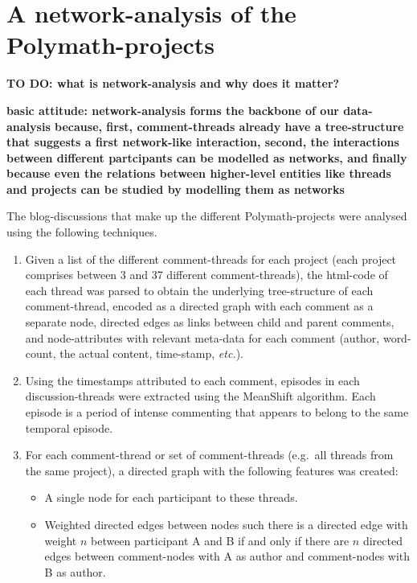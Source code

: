 \documentclass[article, floatfix, groupaddress, prb]{revtex4-1}
\providecommand{\tightlist}{%
      \setlength{\itemsep}{0pt}\setlength{\parskip}{0pt}}
\begin{document}
    \section{A network-analysis of the
Polymath-projects}\label{a-network-analysis-of-the-polymath-projects}

\textbf{TO DO: what is network-analysis and why does it matter?}

\textbf{basic attitude: network-analysis forms the backbone of our
data-analysis because, first, comment-threads already have a
tree-structure that suggests a first network-like interaction, second,
the interactions between different partcipants can be modelled as
networks, and finally because even the relations between higher-level
entities like threads and projects can be studied by modelling them as
networks}

The blog-discussions that make up the different Polymath-projects were
analysed using the following techniques.

\begin{enumerate}
\def\labelenumi{\arabic{enumi}.}
\item
  Given a list of the different comment-threads for each project (each
  project comprises between 3 and 37 different comment-threads), the
  html-code of each thread was parsed to obtain the underlying
  tree-structure of each comment-thread, encoded as a directed graph
  with each comment as a separate node, directed edges as links between
  child and parent comments, and node-attributes with relevant meta-data
  for each comment (author, word-count, the actual content, time-stamp,
  \emph{etc.}).
\item
  Using the timestamps attributed to each comment, episodes in each
  discussion-threads were extracted using the MeanShift algorithm. Each
  episode is a period of intense commenting that appears to belong to
  the same temporal episode.
\item
  For each comment-thread or set of comment-threads (e.g.~all threads
  from the same project), a directed graph with the following features
  was created:

  \begin{itemize}
  \tightlist
  \item
    A single node for each participant to these threads.
  \item
    Weighted directed edges between nodes such there is a directed edge
    with weight \(n\) between participant A and B if and only if there
    are \(n\) directed edges between comment-nodes with A as author and
    comment-nodes with B as author.
  \end{itemize}
\end{enumerate}
\end{document}
